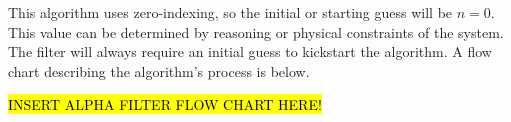 

        This algorithm uses zero-indexing, so the initial or starting guess will be $n=0$.
        This value can be determined by reasoning or physical constraints of the system.
        The filter will always require an initial guess to kickstart the algorithm.
        A flow chart describing the algorithm's process is below.

        \hl{INSERT ALPHA FILTER FLOW CHART HERE!}
        

